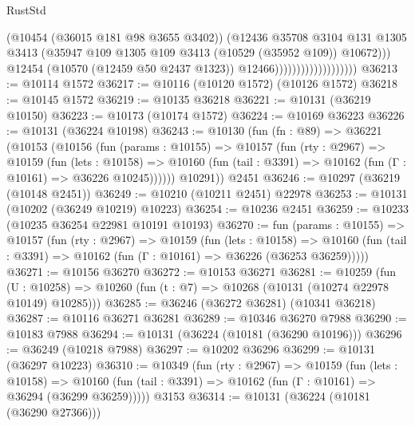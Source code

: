 \begin{lexlean}{RustStd}
\begin{coremodule}
                                            (@10454 (@36015 @181 @98 @3655 @3402))
                                            (@12436
                                              @35708
                                              @3104
                                              @131
                                              @1305
                                              @3413
                                              (@35947
                                                @109
                                                @1305
                                                @109
                                                @3413
                                                (@10529 (@35952 @109))
                                                @10672)))
                                          @12454
                                          (@10570 (@12459 @50 @2437 @1323))
                                          @12466)))))))))))))))))))
@36213 := @10114 @1572
@36217 := @10116 (@10120 @1572) (@10126 @1572)
@36218 := @10145 @1572
@36219 := @10135 @36218
@36221 := @10131 (@36219 @10150)
@36223 := @10173 (@10174 @1572)
@36224 := @10169 @36223
@36226 := @10131 (@36224 @10198)
@36243 := @10130
    (fun (fn : @89) =>
    @36221
      (@10153
        (@10156
          (fun (params : @10155) =>
          @10157
            (fun (rty : @2967) =>
            @10159
              (fun (lets : @10158) =>
              @10160 (fun (tail : @3391) => @10162 (fun (Γ : @10161) => @36226 @10245))))))
        @10291))
    @2451
@36246 := @10297 (@36219 (@10148 @2451))
@36249 := @10210 (@10211 @2451) @22978
@36253 := @10131 (@10202 (@36249 @10219) @10223)
@36254 := @10236 @2451
@36259 := @10233 (@10235 @36254 @22981 @10191 @10193)
@36270 := fun (params : @10155) =>
  @10157
    (fun (rty : @2967) =>
    @10159
      (fun (lets : @10158) =>
      @10160 (fun (tail : @3391) => @10162 (fun (Γ : @10161) => @36226 (@36253 @36259)))))
@36271 := @10156 @36270
@36272 := @10153 @36271
@36281 := @10259
    (fun (U : @10258) => @10260 (fun (t : @7) => @10268 (@10131 (@10274 @22978 @10149) @10285)))
@36285 := @36246 (@36272 @36281) (@10341 @36218)
@36287 := @10116 @36271 @36281
@36289 := @10346 @36270 @7988
@36290 := @10183 @7988
@36294 := @10131 (@36224 (@10181 (@36290 @10196)))
@36296 := @36249 (@10218 @7988)
@36297 := @10202 @36296
@36299 := @10131 (@36297 @10223)
@36310 := @10349
    (fun (rty : @2967) =>
    @10159
      (fun (lets : @10158) =>
      @10160 (fun (tail : @3391) => @10162 (fun (Γ : @10161) => @36294 (@36299 @36259)))))
    @3153
@36314 := @10131 (@36224 (@10181 (@36290 @27366)))

\end{coremodule}
\end{lexlean}
